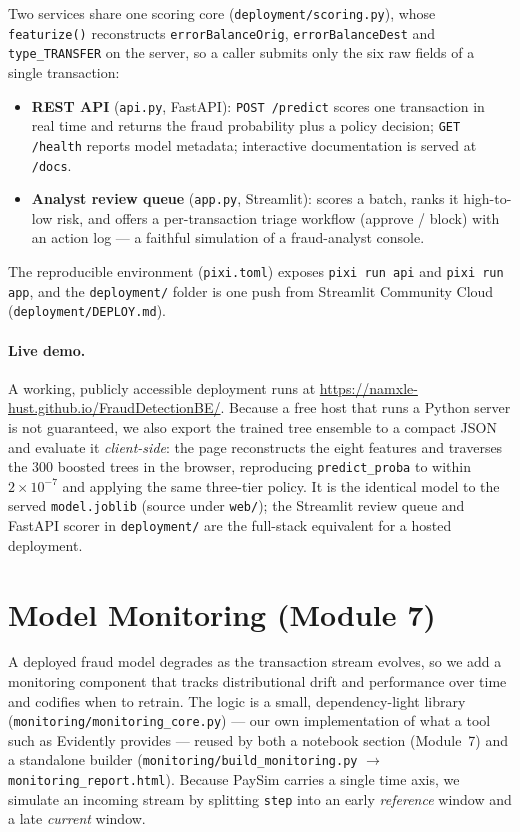 \documentclass{article}
\begin{document}
Two services share one scoring core (\texttt{deployment/scoring.py}), whose
\texttt{featurize()} reconstructs \texttt{errorBalanceOrig},
\texttt{errorBalanceDest} and \texttt{type\_TRANSFER} on the server, so a
caller submits only the six raw fields of a single transaction:
\begin{itemize}
    \item \textbf{REST API} (\texttt{api.py}, FastAPI): \texttt{POST /predict}
    scores one transaction in real time and returns the fraud probability plus
    a policy decision; \texttt{GET /health} reports model metadata; interactive
    documentation is served at \texttt{/docs}.
    \item \textbf{Analyst review queue} (\texttt{app.py}, Streamlit): scores a
    batch, ranks it high-to-low risk, and offers a per-transaction triage
    workflow (approve / block) with an action log --- a faithful simulation of
    a fraud-analyst console.
\end{itemize}
The reproducible environment (\texttt{pixi.toml}) exposes \texttt{pixi run api}
and \texttt{pixi run app}, and the \texttt{deployment/} folder is one push from
Streamlit Community Cloud (\texttt{deployment/DEPLOY.md}).

\paragraph{Live demo.} A working, publicly accessible deployment runs at
\url{https://namxle-hust.github.io/FraudDetectionBE/}. Because a free host that
runs a Python server is not guaranteed, we also export the trained tree ensemble
to a compact JSON and evaluate it \emph{client-side}: the page reconstructs the
eight features and traverses the 300 boosted trees in the browser, reproducing
\texttt{predict\_proba} to within $2\times10^{-7}$ and applying the same
three-tier policy. It is the identical model to the served \texttt{model.joblib}
(source under \texttt{web/}); the Streamlit review queue and FastAPI scorer in
\texttt{deployment/} are the full-stack equivalent for a hosted deployment.

\section{Model Monitoring (Module 7)}
\label{sec:monitoring}

A deployed fraud model degrades as the transaction stream evolves, so we add a
monitoring component that tracks distributional drift and performance over time
and codifies when to retrain. The logic is a small, dependency-light library
(\texttt{monitoring/monitoring\_core.py}) --- our own implementation of what a
tool such as Evidently provides --- reused by both a notebook section
(Module~7) and a standalone builder
(\texttt{monitoring/build\_monitoring.py} $\rightarrow$
\texttt{monitoring\_report.html}). Because PaySim carries a single time axis,
we simulate an incoming stream by splitting \texttt{step} into an early
\emph{reference} window and a late \emph{current} window.
\end{document}
